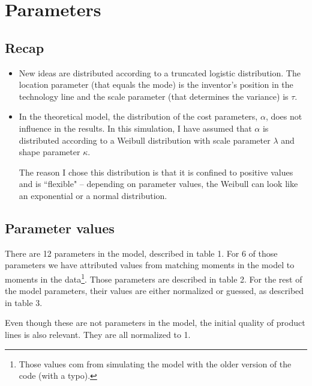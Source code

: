 \documentclass[a4paper,11pt]{article}
\begin{document}
\section{Parameters}

\subsection{Recap}

\begin{itemize}
\item New ideas are distributed according to a truncated logistic distribution. The location parameter (that equals the mode) is the inventor's position in the technology line and the scale parameter (that determines the variance) is $\tau$.

\item In the theoretical model, the distribution of the cost parameters, $\alpha$, does not influence in the results. In this simulation, I have assumed that $\alpha$ is distributed according to a Weibull distribution with scale parameter $\lambda$ and shape parameter $\kappa$.

The reason I chose this distribution is that it is confined to positive values and is ``flexible" -- depending on parameter values, the Weibull can look like an exponential or a normal distribution.
\end{itemize}

\subsection{Parameter values}

There are 12 parameters in the model, described in table 1. For 6 of those parameters we have attributed values from matching moments in the model to moments in the data\footnote{Those values com from simulating the model with the older version of the code (with a typo).}. Those parameters are described in table 2. For the rest of the model parameters, their values are either normalized or guessed, as described in table 3.

Even though these are not parameters in the model, the initial quality of product lines is also relevant. They are all normalized to 1.
\end{document}
